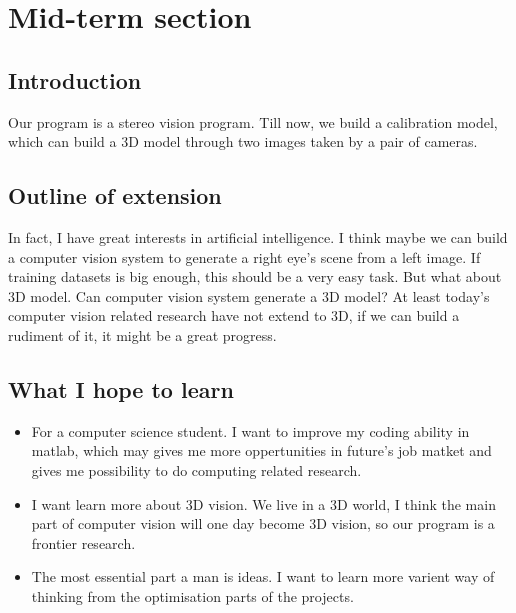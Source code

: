 \chapter{Mid-term section}\label{part:into}
\section{Introduction}
Our program is a stereo vision program. Till now, we build a calibration model, which can build a 3D model through two images taken by a pair of cameras.

\section{Outline of extension}
In fact, I have great interests in artificial intelligence. I think maybe we can build a computer vision system to generate a right eye's scene from a left image. If training datasets is big enough, this should be a very easy task. But what about 3D model. Can computer vision system generate a 3D model? At least today's computer vision related research have not extend to 3D, if we can build a rudiment of it, it might be a great progress.

\section{What I hope to learn}
\begin{itemize}
	\item For a computer science student. I want to improve my coding ability in matlab, which may gives me more oppertunities in future's job matket and gives me possibility to do computing related research.
	\item I want learn more about 3D vision. We live in a 3D world, I think the main part of computer vision will one day become 3D vision, so our program is a frontier research.
	\item The most essential  part a man is ideas. I want to learn more varient way of thinking from the optimisation parts of the projects.
\end{itemize}

